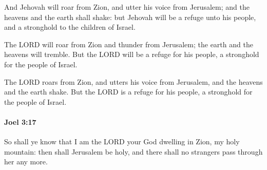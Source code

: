 			\begin{versebox}
					\item[BHS] 
					\item[LXX] 
					\item[ASV] And Jehovah will roar from Zion, and utter his voice from Jerusalem; and the heavens and the earth shall shake: but Jehovah will be a refuge unto his people, and a stronghold to the children of Israel.
					\item[NIV] The LORD will roar from Zion and thunder from Jerusalem; the earth and the heavens will tremble. But the LORD will be a refuge for his people, a stronghold for the people of Israel.
					\item[NRSV] The LORD roars from Zion, and utters his voice from Jerusalem, and the heavens and the earth shake. But the LORD is a refuge for his people, a stronghold for the people of Israel.
			\end{versebox}

		\paragraph{Joel 3:17} %
			\label{JOEL-3-17}

			So shall ye know that I am the LORD your God dwelling in Zion, my holy mountain: then shall Jerusalem be holy, and there shall no strangers pass through her any more.

